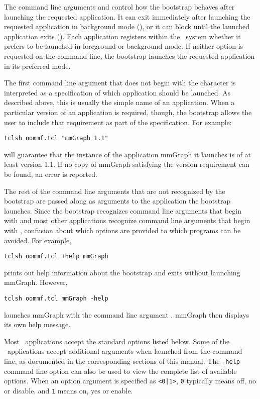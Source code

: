The command line arguments  and  control how the
bootstrap behaves after launching the requested application.  It
can exit immediately after launching the requested application 
in background mode (), or it can block until the
launched application exits ().  Each application
registers within the \OOMMF\ system whether it prefers to be launched
in foreground or background mode.  If neither option is requested on
the command line, the bootstrap launches the requested application
in its preferred mode.

The first command line argument that does not begin with the
character \cd{+} is interpreted as a specification of which
application should be launched.  As described above, this is 
usually the simple name of an application.
When a particular
version of an application is required, though, the bootstrap
allows the user to include that requirement as part of the
specification.  For example:
\begin{verbatim}
tclsh oommf.tcl "mmGraph 1.1"
\end{verbatim}
will guarantee that the instance of the application mmGraph it
launches is of at least version 1.1.  If no copy of mmGraph
satisfying the version requirement can be found, an error is
reported.

The rest of the command line arguments that are not recognized by
the bootstrap are passed along as arguments to the application the
bootstrap launches.  Since the bootstrap recognizes command line
arguments that begin with \cd{+} and most other applications
recognize command line arguments that begin with \cd{-}, confusion
about which options are provided to which programs can be avoided.
For example,
\begin{verbatim}
tclsh oommf.tcl +help mmGraph
\end{verbatim}
prints out help information about the bootstrap and exits without
launching mmGraph.  However,
\begin{verbatim}
tclsh oommf.tcl mmGraph -help
\end{verbatim}
launches mmGraph with the command line argument .
mmGraph then displays its own help message.

Most \OOMMF\ applications accept the standard options listed below.
Some of the \OOMMF\ applications accept additional arguments when
launched from the command line, as documented in the corresponding
sections of this manual.  The \verb+-help+ command line option can
also be used to view the complete list of available options.  When an
option argument is specified as \verb+<0|1>+, \verb+0+ typically means
off, no or disable, and \verb+1+ means on, yes or enable.

